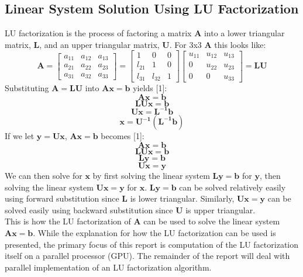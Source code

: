 \documentclass{article}
\begin{document}
\subsection{Linear System Solution Using LU Factorization}
LU factorization is the process of factoring a matrix $\mathbf{A}$ into a lower triangular matrix, $\mathbf{L}$, and an upper triangular matrix, $\mathbf{U}$. For 3x3 $\mathbf{A}$ this looks like:
$$\mathbf{A} = \begin{bmatrix}
	a_{11} & a_{12} & a_{13} \\
	a_{21} & a_{22} & a_{23} \\
	a_{31} & a_{32} & a_{33}
\end{bmatrix} = 
\begin{bmatrix}
	1 & 0 & 0 \\
	l_{21} & 1 & 0 \\
	l_{31} & l_{32} & 1
\end{bmatrix}
\begin{bmatrix}
	u_{11} & u_{12} & u_{13} \\
	0 & u_{22} & u_{23} \\
	0 & 0 & u_{33}
\end{bmatrix} = \mathbf{LU}$$
Substituting $\mathbf{A=LU}$ into $\mathbf{Ax=b}$ yields [1]:
$$\mathbf{Ax=b}$$
$$\mathbf{LUx=b}$$
$$\mathbf{Ux=L^{-1}b}$$
$$\mathbf{x=U^{-1}(L^{-1}b)}$$
If we let $\mathbf{y=Ux}$, $\mathbf{Ax=b}$ becomes [1]:
$$\mathbf{Ax=b}$$
$$\mathbf{LUx=b}$$
$$\mathbf{Ly=b}$$
$$\mathbf{Ux=y}$$
We can then solve for $\mathbf{x}$ by first solving the linear system $\mathbf{Ly=b}$ for $\mathbf{y}$, then solving the linear system $\mathbf{Ux=y}$ for $\mathbf{x}$. $\mathbf{Ly=b}$ can be solved relatively easily using forward substitution since $\mathbf{L}$ is lower triangular. Similarly, $\mathbf{Ux=y}$ can be solved easily using backward substitution since $\mathbf{U}$ is upper triangular.\\ 

This is how the LU factorization of $\mathbf{A}$ can be used to solve the linear system $\mathbf{Ax=b}$. While the explanation for how the LU factorization can be used is presented, the primary focus of this report is computation of the LU factorization itself on a parallel processor (GPU). The remainder of the report will deal with parallel implementation of an LU factorization algorithm.
\end{document}
